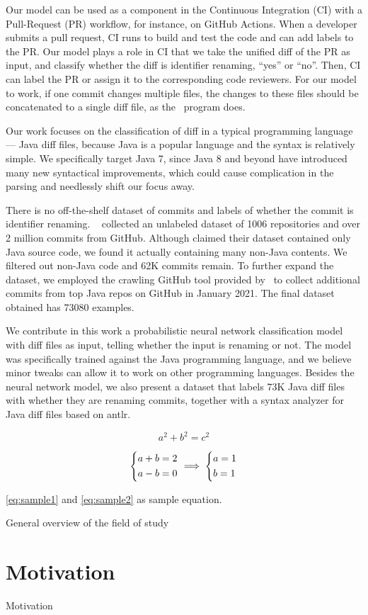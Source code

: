Our model can be used as a component in the Continuous Integration (CI) with a Pull-Request (PR) workflow, for instance, on GitHub Actions.
When a developer submits a pull request, CI runs to build and test the code and can add labels to the PR.
Our model plays a role in CI that we take the unified diff of the PR as input,
and classify whether the diff is identifier renaming, ``yes'' or ``no''.
Then, CI can label the PR or assign it to the corresponding code reviewers.
For our model to work, if one commit changes multiple files,
the changes to these files should be concatenated to a single diff file,
as the~{\gitdiff} program does.

Our work focuses on the classification of diff in a typical programming language
--- Java diff files,
because Java is a popular language and the syntax is relatively simple.
We specifically target Java 7, since Java 8 and beyond have introduced many new syntactical improvements,
which could cause complication in the parsing and needlessly shift our focus away. 

There is no off-the-shelf dataset of commits and labels of whether the commit is identifier renaming.
~\cite{jiang2017} collected an unlabeled dataset of \num{1006} repositories and over 2 million commits from GitHub.
Although  claimed their dataset contained only Java source code,
we found it actually containing many non-Java contents.
We filtered out non-Java code and 62K commits remain.
To further expand the dataset, we employed the crawling GitHub tool provided by~\cite{alexandru2017replicating} to collect additional commits from top Java repos on GitHub in January 2021.
The final dataset obtained has \num{73080} examples.

We contribute in this work a probabilistic neural network classification model with diff files as input, telling whether the input is renaming or not.
The model was specifically trained against the Java programming language, and
we believe minor tweaks can allow it to work on other programming languages.
Besides the neural network model, we also present a dataset that labels 73K Java diff files with whether they are renaming commits,
together with a syntax analyzer for Java diff files based on {\sc antlr}.

\begin{equation}\label{eq:sample1}
	a^2 + b^2 = c^2
\end{equation}

\begin{equation}\label{eq:sample2}
\begin{dcases}
	a + b = 2\\
	a - b = 0
\end{dcases}
\implies
\begin{dcases}
a = 1\\
b = 1
\end{dcases}
\end{equation}

\autoref{eq:sample1} and \ref{eq:sample2} as sample equation.


General overview of the field of study

\section{Motivation}
Motivation